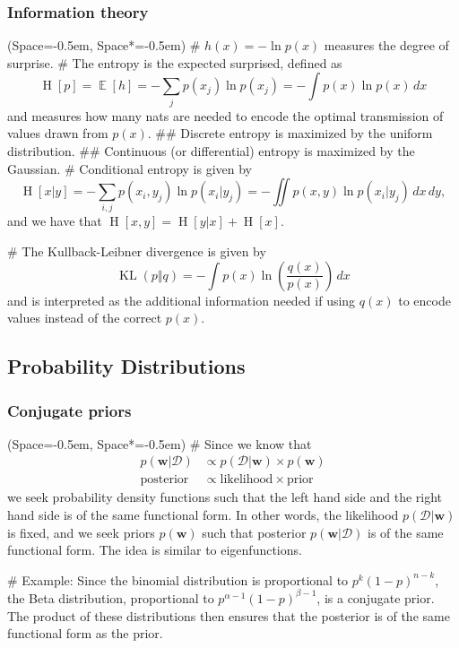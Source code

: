 \documentclass[12pt, a4paper]{article}
\newcommand{\listSpace}{-0.5em}%
\newcommand{\D}{\mathcal{D}}
\newcommand{\vect}[1]{\bm{#1}}
\DeclareMathOperator{\KL}{\operatorname{KL}}
\DeclareMathOperator{\E}{\mathbb{E}}
\renewcommand{\H}{\operatorname{H}}
\begin{document}
\subsubsection*{Information theory}
\begin{easylist}[itemize]
	\ListProperties(Space=\listSpace, Space*=\listSpace)
	# $h(x) = - \ln p(x)$ measures the degree of surprise.
	# The entropy is the expected surprised, defined as
	\begin{equation*}
	\H[p] = \E[h] =
	- \sum_j p(x_j) \ln p(x_j)
	=
	 - \int p(x) \ln p(x) \, dx 
	\end{equation*}
	and measures how many nats are needed to encode the optimal transmission of values drawn from $p(x)$.
	## Discrete entropy is maximized by the uniform distribution.
	## Continuous (or differential) entropy is maximized by the Gaussian.
	# Conditional entropy is given by 
	\begin{equation*}
		\H[x|y] = - \sum_{i,j} p(x_i, y_j) \ln p(x_i | y_j)
		= - \iint p(x, y) \ln p(x_i | y_j) \, dx \, dy ,
	\end{equation*}
	and we have that $\H[x, y] = \H[y | x] + \H[x]$.
	
	# The Kullback-Leibner divergence is given by
	\begin{equation*}
	\KL(p \Vert q) = - \int p(x) \ln \left( \frac{q(x)}{p(x)}\right) \, dx
	\end{equation*}
	and is interpreted as the additional information needed if using $q(x)$ to encode values instead of the correct $p(x)$.
\end{easylist}




\subsection{Probability Distributions}


\subsubsection*{Conjugate priors}
\begin{easylist}[itemize]
	\ListProperties(Space=\listSpace, Space*=\listSpace)
	# Since we know that
	\begin{align*}
	p(\vect{w} | \D) & \propto p(\D | \vect{w}) \times p(\vect{w}) \\
	\text{posterior} & \propto \text{likelihood} \times \text{prior}
	\end{align*}
	we seek probability density functions such that the left hand side and the right hand side is of the same functional form.
	In other words, the likelihood $p(\D | \vect{w})$ is fixed, and we seek priors $p(\vect{w})$ such that posterior $p(\vect{w} | \D)$ is of the same functional form.
	The idea is similar to eigenfunctions.
	
	# Example: 
	Since the binomial distribution is proportional to 
	$p^k (1-p)^{n-k}$, the Beta distribution, proportional to
	$p^{\alpha-1}(1-p)^{\beta-1}$, is a conjugate prior.
	The product of these distributions then ensures that the posterior is of the same functional form as the prior.
\end{easylist}
\end{document}
